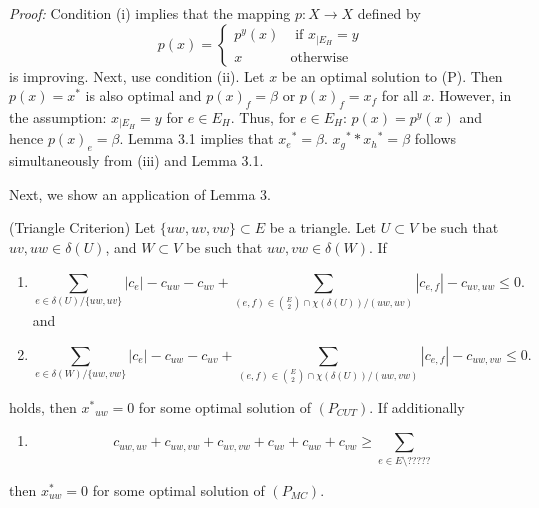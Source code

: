 \textit{Proof:} Condition (i) implies that the mapping $p:X \rightarrow X$ defined by 
\[ p(x)= \begin{cases}
    p^y(x) & \text{ if } x_{|E_H} =y \\
    x & \text{otherwise } 
\end{cases} \]
is improving. 
Next, use condition (ii). Let $x$ be an optimal solution to (P). Then $p(x)=x^*$ is also optimal and $p(x)_f= \beta$ or $p(x)_f=x_f$ for all $x$. However, in the assumption: $x_{|E_H} = y$ for $e \in E_H$. Thus, for $e \in E_H$: $p(x)=p^y(x)$ and hence $p(x)_e=\beta$. Lemma 3.1 implies that ${x_e}^*=\beta$.
${x_g}^* * {x_h}^* = \beta$ follows simultaneously from (iii) and Lemma 3.1.  

Next, we show an application of Lemma 3. 
\begin{corollary}{(Triangle Criterion)}
Let $\{uw,uv,vw\} \subset E$ be a triangle. Let $U \subset V$ be such that $uv, uw \in \delta(U)$, and $W \subset V$ be such that $uw,vw \in \delta(W)$. If 
\begin{enumerate}
\item \begin{equation*}
\sum_{e \in \delta(U)/ \{uw, uv \}} |c_e| - c_{uw} -c_{uv} + \sum_{ (e,f) \in {E \choose 2} \cap \chi(\delta(U))  / (uw, uv)} |c_{e,f}|-c_{uv,uw} \leq 0. 
\end{equation*} and
\item \begin{equation*}
\sum_{e \in \delta(W)/ \{uw, vw \}} |c_e| - c_{uw} -c_{uv} + \sum_{ (e,f) \in {\binom{E}{2}} \cap \chi(\delta(U))  / (uw, vw)} |c_{e,f}| - c_{uw,vw} \leq 0. 
\end{equation*} 
\end{enumerate}
holds, then ${x^*}_{uw}=0$ for some optimal solution of $(P_{CUT})$. If additionally 
\begin{enumerate}[resume]
\item \begin{equation}
c_{uw,uv}+c_{uw,vw}+c_{uv,vw}+c_{uv}+c_{uw}+c_{vw} \geq \sum_{e \in E \setminus ????? } 
\end{equation}
\end{enumerate}
then $x^*_{uw}=0$ for some optimal solution of $(P_{MC})$. 
\end{corollary}

